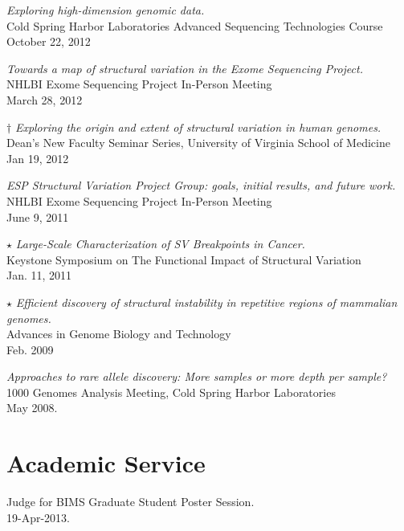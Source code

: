 \documentclass[margin,line]{cv}
\begin{document}
\begin{resume}
    \textit{Exploring high-dimension genomic data.} \\
    Cold Spring Harbor Laboratories Advanced Sequencing Technologies Course \\
    October 22, 2012

    \textit{Towards a map of structural variation in the Exome Sequencing Project.} \\
    NHLBI Exome Sequencing Project In-Person Meeting \\
    March 28, 2012

    $\dagger$ \textit{Exploring the origin and extent of structural variation in human genomes.} \\
    Dean’s New Faculty Seminar Series, University of Virginia School of Medicine \\
    Jan 19, 2012

    \textit{ESP Structural Variation Project Group: goals, initial results, and future work.} \\
    NHLBI Exome Sequencing Project In-Person Meeting \\
    June 9, 2011

    $\star$ \textit{Large-Scale Characterization of SV Breakpoints in Cancer.} \\
    Keystone Symposium on The Functional Impact of Structural Variation \\
    Jan. 11, 2011

    $\star$ \textit{Efficient discovery of structural instability in repetitive regions of mammalian genomes.} \\
    Advances in Genome Biology and Technology \\
    Feb. 2009

    \textit{Approaches to rare allele discovery: More samples or more depth per sample? } \\
    1000 Genomes Analysis Meeting, Cold Spring Harbor Laboratories \\
    May 2008.

    \section{\mysidestyle Academic Service}

    Judge for BIMS Graduate Student Poster Session. \\
    19-Apr-2013.


\end{resume}
\end{document}
